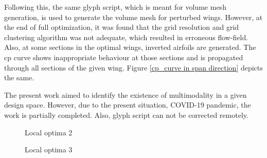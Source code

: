 Following this, the same glyph script, which is meant for volume mesh generation, is used to generate the volume mesh for perturbed wings. However, at the end of full optimization, it was found that the grid resolution and grid clustering algorithm was not adequate, which resulted in erroneous flow-field. Also, at some sections in the optimal wings, inverted airfoils are generated. The cp curve shows inappropriate behaviour at those sections and is propagated through all sections of the given wing. Figure \ref{cp_curve in span direction} depicts the same.

The present work aimed to identify the existence of multimodality in a given design space. However, due to the present situation, COVID-19 pandemic, the work is partially completed. Also, glyph script can not be corrected remotely.

\begin{figure}[!htbp]
    \centering
    \caption{Local optima 2}
    \label{local optima 2}
\end{figure}

\begin{figure}[!htbp]
    \centering
    \caption{Local optima 3}
    \label{local optima 3}
\end{figure}

